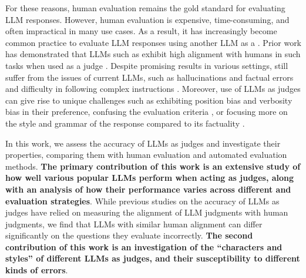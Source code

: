 For these reasons, human evaluation remains the gold standard for evaluating LLM responses. %
However, human evaluation is expensive, time-consuming, and often impractical in many use cases. 
As a result, it has increasingly become common practice to evaluate LLM responses using another LLM as a \judgemodel \citep[e.g.][]{lin2021truthfulqa,islam2023financebench,chiang2023can,liusie2024llm}.
Prior work has demonstrated that LLMs such as  exhibit high alignment with humans in such tasks when used as a judge \citep{sottana2023evaluation,zheng2024judging}. 
Despite promising results in various settings, \judgemodels still suffer from the issues of current LLMs, such as hallucinations and factual errors \citep{ye2023cognitive, turpin2023language} and difficulty in following complex instructions \citep{li2023instruction, he2024can}. Moreover, use of LLMs as judges can give rise to unique challenges such as exhibiting position bias \citep{pezeshkpour2023large} and verbosity bias \citep{saito2023verbosity} in their preference, confusing the evaluation criteria \citep{hu2024llm}, or focusing more on the style and grammar of the response compared to its factuality \citep{wu2023style}.
%

In this work, we assess the accuracy of LLMs as judges and investigate their properties, comparing them with human evaluation and automated evaluation methods. 
\textbf{The primary contribution of this work is an extensive study of how well various popular LLMs perform when acting as judges, along with an analysis of how their performance varies across different \judgemodels and evaluation strategies}. 
While previous studies on the accuracy of LLMs as judges have relied on measuring the alignment of LLM judgments with human judgments, we find that LLMs with similar human alignment can differ significantly on the questions they evaluate incorrectly. 
\textbf{The second contribution of this work is an investigation of the ``characters and styles'' of different LLMs as judges, and their susceptibility to different kinds of errors}.

